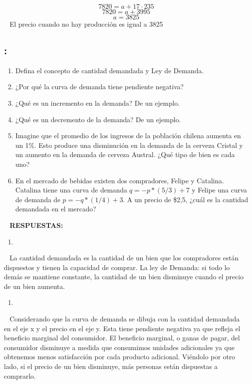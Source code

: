 \documentclass[
  letterpaper,
  DIV=11,
  numbers=noendperiod]{scrreport}
\providecommand{\tightlist}{%
  \setlength{\itemsep}{0pt}\setlength{\parskip}{0pt}}\usepackage{longtable,booktabs,array}
\begin{document}
\[7820=a+17\cdot235\] \[7820=a+3995\] \[a=3825\] ~ El precio cuando no
hay producción es igual a 3825

\hypertarget{section-9}{%
\subsection{:}\label{section-9}}

\begin{enumerate}
\def\labelenumi{\alph{enumi})}
\item
  Defina el concepto de cantidad demandada y Ley de Demanda.
\item
  ¿Por qué la curva de demanda tiene pendiente negativa?
\item
  ¿Qué es un incremento en la demanda? De un ejemplo.
\item
  ¿Qué es un decremento de la demanda? De un ejemplo.
\item
  Imagine que el promedio de los ingresos de la población chilena
  aumenta en un 1\%. Esto produce una disminución en la demanda de la
  cerveza Cristal y un aumento en la demanda de cerveza Austral. ¿Qué
  tipo de bien es cada uno?
\item
  En el mercado de bebidas existen dos compradores, Felipe y Catalina.
  Catalina tiene una curva de demanda \(q = -p*(5/3) + 7\) y Felipe una
  curva de demanda de \(p= -q*(1/4) + 3\). A un precio de \$2,5, ¿cuál
  es la cantidad demandada en el mercado?
\end{enumerate}

~ \textbf{RESPUESTAS:}

\begin{enumerate}
\def\labelenumi{\alph{enumi})}
\tightlist
\item
\end{enumerate}

~ La cantidad demandada es la cantidad de un bien que los compradores
están dispuestos y tienen la capacidad de comprar. La ley de Demanda: si
todo lo demás se mantiene constante, la cantidad de un bien disminuye
cuando el precio de un bien aumenta.

\begin{enumerate}
\def\labelenumi{\alph{enumi})}
\setcounter{enumi}{1}
\tightlist
\item
\end{enumerate}

~ Considerando que la curva de demanda se dibuja con la cantidad
demandada en el eje x y el precio en el eje y. Esta tiene pendiente
negativa ya que refleja el beneficio marginal del consumidor. El
beneficio marginal, o ganas de pagar, del consumidor disminuye a medida
que consumimos unidades adicionales ya que obtenemos menos satisfacción
por cada producto adicional. Viéndolo por otro lado, si el precio de un
bien disminuye, más personas están dispuestas a comprarlo.
\end{document}

